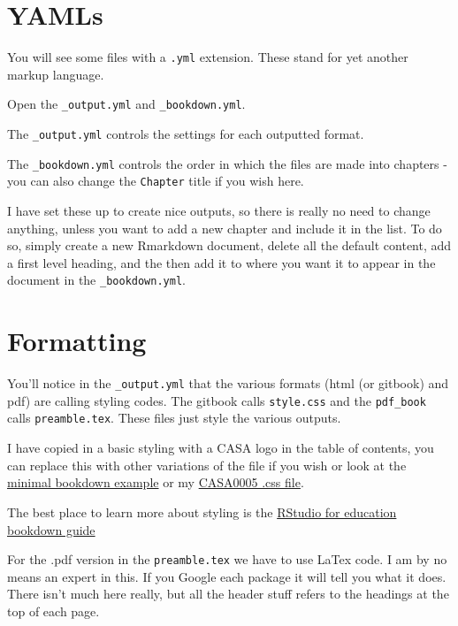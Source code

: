 \documentclass[
  12pt,
  oneside]{book}
\begin{document}
\hypertarget{yamls}{%
\section{YAMLs}\label{yamls}}

You will see some files with a \texttt{.yml} extension. These stand for yet another markup language.

Open the \texttt{\_output.yml} and \texttt{\_bookdown.yml}.

The \texttt{\_output.yml} controls the settings for each outputted format.

The \texttt{\_bookdown.yml} controls the order in which the files are made into chapters - you can also change the \texttt{Chapter} title if you wish here.

I have set these up to create nice outputs, so there is really no need to change anything, unless you want to add a new chapter and include it in the list. To do so, simply create a new Rmarkdown document, delete all the default content, add a first level heading, and the then add it to where you want it to appear in the document in the \texttt{\_bookdown.yml}.

\hypertarget{formatting}{%
\section{Formatting}\label{formatting}}

You'll notice in the \texttt{\_output.yml} that the various formats (html (or gitbook) and pdf) are calling styling codes. The gitbook calls \texttt{style.css} and the \texttt{pdf\_book} calls \texttt{preamble.tex}. These files just style the various outputs.

I have copied in a basic styling with a CASA logo in the table of contents, you can replace this with other variations of the file if you wish or look at the \href{https://github.com/rstudio/bookdown-demo}{minimal bookdown example} or my \href{https://github.com/andrewmaclachlan/CASA0005repo/blob/master/assets/style.css}{CASA0005 .css file}.

The best place to learn more about styling is the \href{https://rstudio4edu.github.io/rstudio4edu-book/intro-bookdown.html}{RStudio for education bookdown guide}

For the .pdf version in the \texttt{preamble.tex} we have to use LaTex code. I am by no means an expert in this. If you Google each package it will tell you what it does. There isn't much here really, but all the header stuff refers to the headings at the top of each page.
\end{document}
